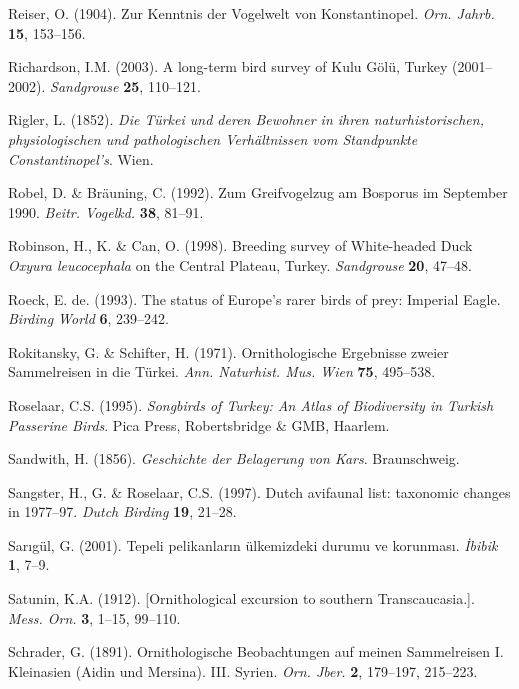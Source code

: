 \documentclass[
  a4paper,
  DIV=11,
  numbers=noendperiod]{scrreprt}
\newlength{\cslhangindent}
\newenvironment{CSLReferences}[2] %
 {\begin{list}{}{%
  \setlength{\itemindent}{0pt}
  \setlength{\leftmargin}{0pt}
  \setlength{\parsep}{0pt}
  \ifodd #1
   \setlength{\leftmargin}{\cslhangindent}
   \setlength{\itemindent}{-1\cslhangindent}
  \fi
  \setlength{\itemsep}{#2\baselineskip}}}
 {\end{list}}
\begin{document}
\begin{CSLReferences}{1}{1}
Reiser, O. (1904). {Zur Kenntnis der Vogelwelt von Konstantinopel}.
\emph{Orn. Jahrb.} \textbf{15}, 153--156.

Richardson, I.M. (2003). {A long-term bird survey of Kulu Gölü, Turkey
(2001--2002)}. \emph{Sandgrouse} \textbf{25}, 110--121.

Rigler, L. (1852). \emph{{Die Türkei und deren Bewohner in ihren
naturhistorischen, physiologischen und pathologischen Verhältnissen vom
Standpunkte Constantinopel's}}. Wien.

Robel, D. \& Bräuning, C. (1992). {Zum Greifvogelzug am Bosporus im
September 1990}. \emph{Beitr. Vogelkd.} \textbf{38}, 81--91.

Robinson, H., K. \& Can, O. (1998). {Breeding survey of White-headed
Duck \emph{Oxyura leucocephala} on the Central Plateau, Turkey}.
\emph{Sandgrouse} \textbf{20}, 47--48.

Roeck, E. de. (1993). {The status of Europe's rarer birds of prey:
Imperial Eagle}. \emph{Birding World} \textbf{6}, 239--242.

Rokitansky, G. \& Schifter, H. (1971). {Ornithologische Ergebnisse
zweier Sammelreisen in die Türkei}. \emph{Ann. Naturhist. Mus. Wien}
\textbf{75}, 495--538.

Roselaar, C.S. (1995). \emph{{Songbirds of Turkey: An Atlas of
Biodiversity in Turkish Passerine Birds}}. Pica Press, Robertsbridge \&
GMB, Haarlem.

Sandwith, H. (1856). \emph{{Geschichte der Belagerung von Kars}}.
Braunschweig.

Sangster, H., G. \& Roselaar, C.S. (1997). {Dutch avifaunal list:
taxonomic changes in 1977--97}. \emph{Dutch Birding} \textbf{19},
21--28.

Sarıgül, G. (2001). {Tepeli pelikanların ülkemizdeki durumu ve
korunması}. \emph{İbibik} \textbf{1}, 7--9.

Satunin, K.A. (1912). {{[}Ornithological excursion to southern
Transcaucasia.{]}}. \emph{Mess. Orn.} \textbf{3}, 1--15, 99--110.

Schrader, G. (1891). {Ornithologische Beobachtungen auf meinen
Sammelreisen I. Kleinasien (Aidin und Mersina). III. Syrien}. \emph{Orn.
Jber.} \textbf{2}, 179--197, 215--223.


\end{CSLReferences}
\end{document}
